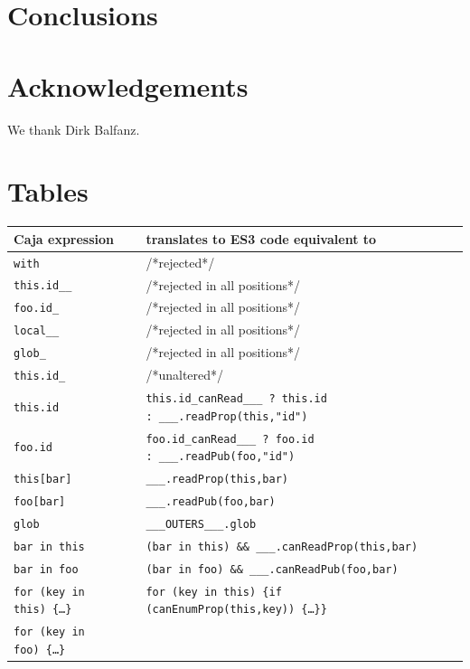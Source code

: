 \documentclass[letterpaper,twocolumn,10pt]{article}
\newcommand{\code}[1]{{\tt {#1}}}              %
\begin{document}
\section{Conclusions}

\section{Acknowledgements}

We thank Dirk Balfanz.

\appendix

\section{Tables}

\begin{table}
\begin{tabular}{ll}
  Caja expression    & translates to ES3 code equivalent to\\ 
  \hline
  \code{with}        & /*rejected*/ \\
  \hline
  \code{this.id\_\_} & /*rejected in all positions*/ \\
  \code{foo.id\_}    & /*rejected in all positions*/ \\      
  \code{local\_\_}   & /*rejected in all positions*/ \\        
  \code{glob\_}      & /*rejected in all positions*/ \\        
  \hline
  \code{this.id\_}   & /*unaltered*/ \\
  \code{this.id}
    & \code{this.id\_canRead\_\_\_ ?\ this.id :\ \_\_\_.readProp(this,"id")}\\
  \code{foo.id}
    & \code{foo.id\_canRead\_\_\_ ?\ foo.id :\ \_\_\_.readPub(foo,"id")} \\
  \code{this[bar]}   & \code{\_\_\_.readProp(this,bar)} \\
  \code{foo[bar]}    & \code{\_\_\_.readPub(foo,bar)}  \\
  \code{glob}        & \code{\_\_\_OUTERS\_\_\_.glob} \\
  \hline
  \code{bar in this}           
    & \code{(bar in this) \&\& \_\_\_.canReadProp(this,bar)} \\
  \code{bar in foo}            
    & \code{(bar in foo) \&\& \_\_\_.canReadPub(foo,bar)} \\
  \code{for (key in this)\ \{\ldots\}} 
    &\code{for (key in this)\ \{if (canEnumProp(this,key))\ \{\ldots\}\}}\\
  \code{for (key in foo)\ \{\ldots\}}  

\end{tabular}
\end{table}
\end{document}
